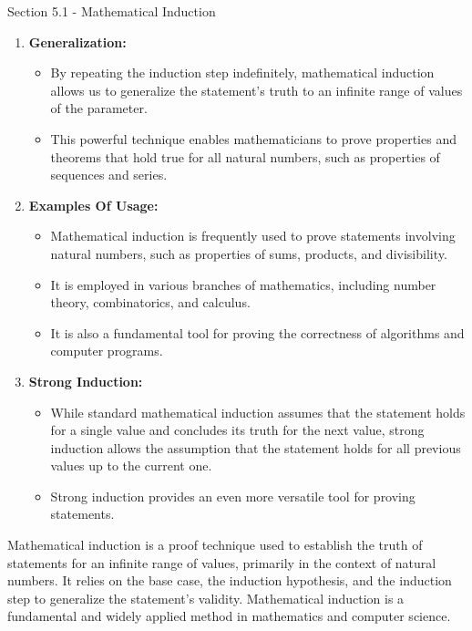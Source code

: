 \begin{notes}{Section 5.1 - Mathematical Induction}
\begin{enumerate}[label = \arabic*.]
\begin{itemize}
        \end{itemize}
        \item \textbf{Generalization:}
        \begin{itemize}
            \item By repeating the induction step indefinitely, mathematical induction allows us to generalize the statement's truth to an infinite range of values of the parameter.
            \item This powerful technique enables mathematicians to prove properties and theorems that hold true for all natural numbers, such as properties of sequences and series.
        \end{itemize}
        \item \textbf{Examples Of Usage:}
        \begin{itemize}
            \item Mathematical induction is frequently used to prove statements involving natural numbers, such as properties of sums, products, and divisibility.
            \item It is employed in various branches of mathematics, including number theory, combinatorics, and calculus.
            \item It is also a fundamental tool for proving the correctness of algorithms and computer programs.
        \end{itemize}
        \item \textbf{Strong Induction:}
        \begin{itemize}
            \item While standard mathematical induction assumes that the statement holds for a single value and concludes its truth for the next value, strong induction allows the assumption that the 
            statement holds for all previous values up to the current one.
            \item Strong induction provides an even more versatile tool for proving statements.
        \end{itemize}
    \end{enumerate}
        
    Mathematical induction is a proof technique used to establish the truth of statements for an infinite range of values, primarily in the context of natural numbers. It relies on the base case, the 
    induction hypothesis, and the induction step to generalize the statement's validity. Mathematical induction is a fundamental and widely applied method in mathematics and computer science.
\end{notes}

